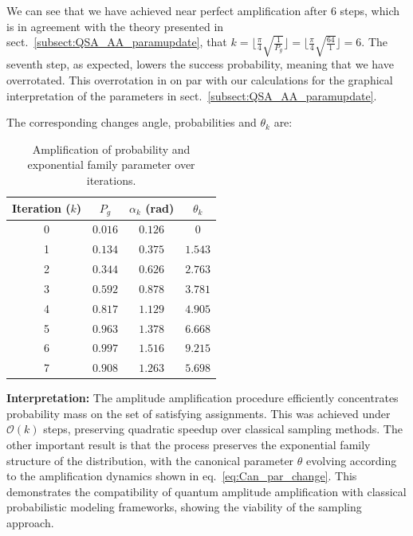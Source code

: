 \documentclass[encoding=utf8,british]{tumphthesis}
\begin{document}
            We can see that we have achieved near perfect amplification after 6 steps, which is in agreement with the theory presented in sect.~\ref{subsect:QSA_AA_paramupdate},
            that $k = \lfloor \frac{\pi}{4}\sqrt{\frac{1}{P_g}} \rfloor = \lfloor \frac{\pi}{4}\sqrt{\frac{64}{1}} \rfloor = 6$. The seventh step, as expected,
            lowers the success probability, meaning that we have overrotated. This overrotation in on par with our calculations for the graphical interpretation
            of the parameters in sect.~\ref{subsect:QSA_AA_paramupdate}.

            The corresponding changes angle, probabilities and $\theta_k$ are:

            \begin{table}[H]
                \centering
                \begin{tabular}{|c|c|c|c|}
                    \hline
                    Iteration ($k$) & $P_g$ & $\alpha_k$ (rad) & $\theta_k$ \\
                    \hline
                    0 & $0.016$ & $0.126$ & $0$ \\
                    \hline
                    1 & $0.134$ & $0.375$ & $1.543$ \\
                    \hline
                    2 & $0.344$ & $0.626$ & $2.763$ \\
                    \hline
                    3 & $0.592$ & $0.878$ & $3.781$ \\
                    \hline
                    4 & $0.817$ & $1.129$ & $4.905$ \\
                    \hline
                    5 & $0.963$ & $1.378$ & $6.668$ \\
                    \hline
                    6 & $0.997$ & $1.516$ & $9.215$ \\
                    \hline
                    7 & $0.908$ & $1.263$ & $5.698$ \\
                    \hline
                \end{tabular}
                \caption{Amplification of probability and exponential family parameter over iterations.}
                \label{tab:amplification_results}
            \end{table}

            \noindent
            \textbf{Interpretation:} The amplitude amplification procedure efficiently concentrates probability mass on the set of 
            satisfying assignments. This was achieved under $\mathcal{O}(k)$ steps, preserving quadratic speedup over classical sampling 
            methods. The other important result is that the process preserves the exponential family structure of the distribution, with 
            the canonical parameter $\theta$ evolving according to the amplification dynamics shown in eq.~\ref{eq:Can_par_change}. 
            This demonstrates the compatibility of quantum amplitude amplification with classical probabilistic 
            modeling frameworks, showing the viability of the sampling approach.
\end{document}
